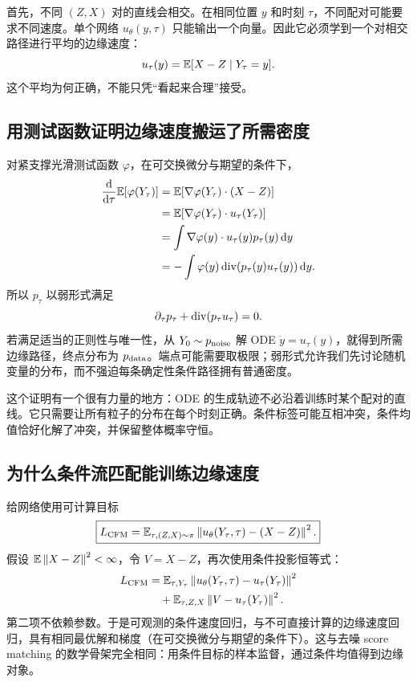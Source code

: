 首先，不同 $(Z,X)$ 对的直线会相交。在相同位置 $y$ 和时刻 $\tau$，不同配对可能要求不同速度。单个网络 $u_\theta(y,\tau)$ 只能输出一个向量。因此它必须学到一个对相交路径进行平均的边缘速度：
\begin{equation}
 u_\tau(y)=\mathbb{E}[X-Z\mid Y_\tau=y].
 \label{eq:marginal-velocity}
\end{equation}
这个平均为何正确，不能只凭“看起来合理”接受。

\subsection{用测试函数证明边缘速度搬运了所需密度}
对紧支撑光滑测试函数 $\varphi$，在可交换微分与期望的条件下，
\begin{align}
 \frac{\mathop{}\!\mathrm{d}}{\mathop{}\!\mathrm{d}\tau}\mathbb{E}[\varphi(Y_\tau)]
 &=\mathbb{E}[\nabla\varphi(Y_\tau)\cdot(X-Z)]\\
 &=\mathbb{E}[\nabla\varphi(Y_\tau)\cdot u_\tau(Y_\tau)]\\
 &=\int\nabla\varphi(y)\cdot u_\tau(y)p_\tau(y)\mathop{}\!\mathrm{d} y\\
 &=-\int\varphi(y)\operatorname{div}(p_\tau(y)u_\tau(y))\mathop{}\!\mathrm{d} y.
\end{align}
所以 $p_\tau$ 以弱形式满足
\begin{equation}
 \partial_\tau p_\tau+\operatorname{div}(p_\tau u_\tau)=0.
\end{equation}
若满足适当的正则性与唯一性，从 $Y_0\sim p_{\mathrm{noise}}$ 解 ODE $\dot y=u_\tau(y)$，就得到所需边缘路径，终点分布为 $p_{\mathrm{data}}$。端点可能需要取极限；弱形式允许我们先讨论随机变量的分布，而不强迫每条确定性条件路径拥有普通密度。

这个证明有一个很有力量的地方：ODE 的生成轨迹不必沿着训练时某个配对的直线。它只需要让所有粒子的分布在每个时刻正确。条件标签可能互相冲突，条件均值恰好化解了冲突，并保留整体概率守恒。

\subsection{为什么条件流匹配能训练边缘速度}
给网络使用可计算目标
\begin{equation}\boxed{
 L_{\mathrm{CFM}}=\mathbb{E}_{\tau,(Z,X)\sim\pi}
 \left\lVert u_\theta(Y_\tau,\tau)-(X-Z)\right\rVert^2.
 }\label{eq:cfm}\end{equation}
假设 $\mathbb{E}\left\lVert X-Z\right\rVert^2<\infty$，令 $V=X-Z$，再次使用条件投影恒等式：
\begin{align}
 L_{\mathrm{CFM}}
 &=\mathbb{E}_{\tau,Y_\tau}\left\lVert u_\theta(Y_\tau,\tau)-u_\tau(Y_\tau)\right\rVert^2\\
 &\quad+\mathbb{E}_{\tau,Z,X}\left\lVert V-u_\tau(Y_\tau)\right\rVert^2.
\end{align}
第二项不依赖参数。于是可观测的条件速度回归，与不可直接计算的边缘速度回归，具有相同最优解和梯度（在可交换微分与期望的条件下）。这与去噪 score matching 的数学骨架完全相同：用条件目标的样本监督，通过条件均值得到边缘对象。

